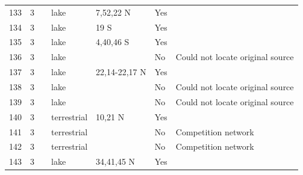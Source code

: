 \documentclass[12pt]{article}
\begin{document}
\begin{landscape}
\begin{table}[h!]
{\begin{tabular}{p{2.8cm}p{1.3cm}p{5.5cm}p{2.2cm}p{2.5cm}lp{3.5cm}}
        133   & 3 & \citet{Beaver1985}  & lake  & 7,52,22 N & Yes   &       \\
        134   & 3 & \citet{Beaver1985}  & lake  & 19 S  & Yes   &       \\
        135   & 3 & \citet{Beaver1985}  & lake  & 4,40,46 S & Yes   &       \\
        136   & 3 & \citet{Bradshaw1983}    & lake  &       & No    & Could not locate original source \\
        137   & 3 & \citet{Corker1984}  & lake  & 22,14-22,17 N & Yes   &       \\
        138   & 3 & \citet{Kitching1983}     & lake  &       & No    & Could not locate original source \\
        139   & 3 & \citet{Kitching1983}  & lake  &       & No    & Could not locate original source \\
        140   & 3 & \citet{Seifert1979}  & terrestrial & 10,21 N & Yes   &       \\
        141   & 3 & \citet{Seifert1976}  & terrestrial &       & No    & Competition network \\
        142   & 3 & \citet{Seifert1976}  & terrestrial &       & No    & Competition network \\
        143   & 3 & \citet{Snow1958}    & lake  & 34,41,45 N & Yes   &       \\
         \hline
      \end{tabular}}%
      \end{table}

        \newpage


\end{landscape}
\end{document}
